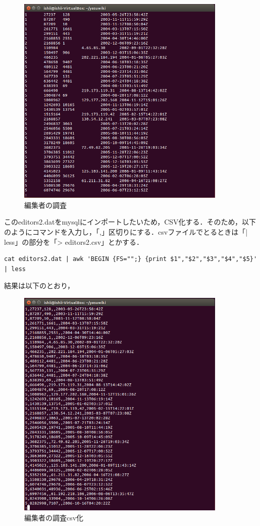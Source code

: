 \begin{figure}[H]
\centering
\includegraphics[width=10cm]{editors2_data.png}
\caption{編集者の調査}\label{サンプル図}
\end{figure}


このeditors2.datをmysqlにインポートしたいため，CSV化する．そのため，以下のようにコマンドを入力し，「,」区切りにする．csvファイルでとるときは「| less」の部分を「> editors2.csv」とかする．

{\small
\begin{verbatim}
cat editors2.dat | awk 'BEGIN {FS="";} {print $1","$2","$3","$4","$5}' | less
\end{verbatim}}

結果は以下のとおり，

\begin{figure}[H]
\centering
\includegraphics[width=10cm]{editors2_csv.png}
\caption{編集者の調査csv化}\label{サンプル図}
\end{figure}



